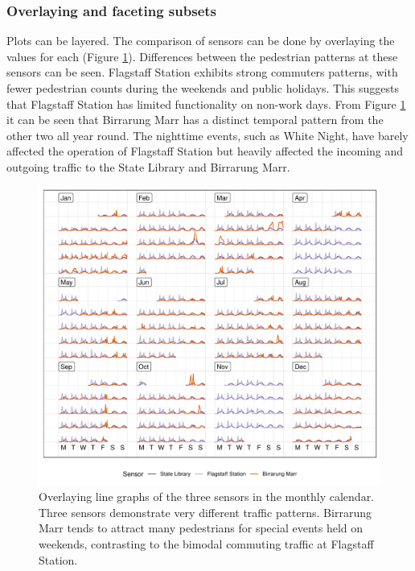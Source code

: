 \documentclass[12pt]{article}
\begin{document}
\hypertarget{overlaying-and-faceting-subsets}{%
\subsubsection{Overlaying and faceting subsets}\label{overlaying-and-faceting-subsets}}

Plots can be layered. The comparison of sensors can be done by overlaying the values for each (Figure \ref{fig:overlay}). Differences between the pedestrian patterns at these sensors can be seen. Flagstaff Station exhibits strong commuters patterns, with fewer pedestrian counts during the weekends and public holidays. This suggests that Flagstaff Station has limited functionality on non-work days. From Figure \ref{fig:overlay} it can be seen that Birrarung Marr has a distinct temporal pattern from the other two all year round. The nighttime events, such as White Night, have barely affected the operation of Flagstaff Station but heavily affected the incoming and outgoing traffic to the State Library and Birrarung Marr.

\begin{figure}

{\centering \includegraphics[width=\textwidth]{figure/overlay-1} 

}

\caption{Overlaying line graphs of the three sensors in the monthly calendar. Three sensors demonstrate very different traffic patterns. Birrarung Marr tends to attract many pedestrians for special events held on weekends, contrasting to the bimodal commuting traffic at Flagstaff Station.}\label{fig:overlay}
\end{figure}
\end{document}
